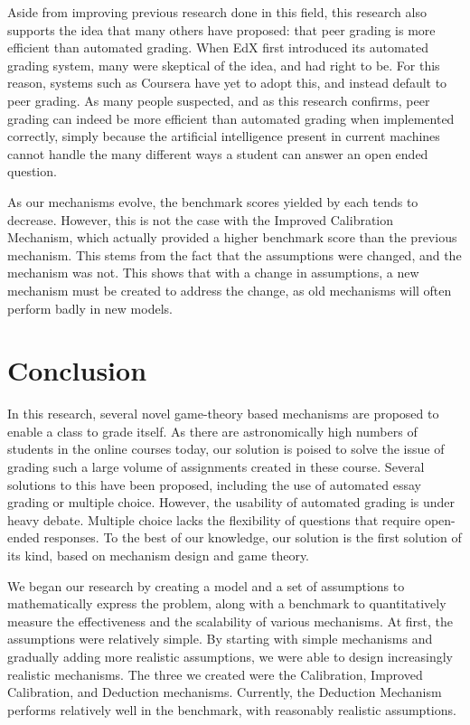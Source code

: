 \documentclass[12pt, Arial]{article}
\begin{document}
Aside from improving previous research done in this field, this research also supports the idea that many others have proposed: that peer grading is more efficient than automated grading. When EdX first introduced its automated grading system, many were skeptical of the idea, and had right to be. For this reason, systems such as Coursera have yet to adopt this, and instead default to peer grading. As many people suspected, and as this research confirms, peer grading can indeed be more efficient than automated grading when implemented correctly, simply because the artificial intelligence present in current machines cannot handle the many different ways a student can answer an open ended question.

As our mechanisms evolve, the benchmark scores yielded by each tends to decrease. However, this is not the case with the Improved Calibration Mechanism, which actually provided a higher benchmark score than the previous mechanism. This stems from the fact that the assumptions were changed, and the mechanism was not. This shows that with a change in assumptions, a new mechanism must be created to address the change, as old mechanisms will often perform badly in new models.

\section{Conclusion}

In this research, several novel game-theory based mechanisms are proposed to enable a class to grade itself. As there are astronomically high numbers of students in the online courses today, our solution is poised to solve the issue of grading such a large volume of assignments created in these course. Several solutions to this have been proposed, including the use of automated essay grading or multiple choice. However, the usability of automated grading is under heavy debate. Multiple choice lacks the flexibility of questions that require open-ended responses. To the best of our knowledge, our solution is the first solution of its kind, based on mechanism design and game theory.

We began our research by creating a model and a set of assumptions to mathematically express the problem, along with a benchmark to quantitatively measure the effectiveness and the scalability of various mechanisms. At first, the assumptions were relatively simple. By starting with simple mechanisms and gradually adding more realistic assumptions, we were able to design increasingly realistic mechanisms. The three we created were the Calibration, Improved Calibration, and Deduction mechanisms. Currently, the Deduction Mechanism performs relatively well in the benchmark, with reasonably realistic assumptions.
\end{document}
